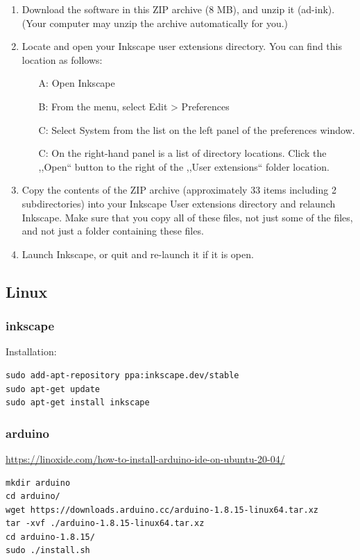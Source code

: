 \begin{enumerate}
  \item         Download the software in this ZIP archive (8 MB), and unzip it (ad-ink). (Your computer may unzip the archive automatically for you.)
  \item         Locate and open your Inkscape user extensions directory. You can find this location as follows:\begin{itemize}
  \item[A:]               Open Inkscape
  \item[B:]               From the menu, select Edit > Preferences
  \item[C:]               Select System from the list on the left panel of the preferences window.
  \item[C:]               On the right-hand panel is a list of directory locations. Click the ,,Open`` button to the right of the ,,User extensions`` folder location.
  \end{itemize}
  \item         Copy the contents of the ZIP archive (approximately 33 items including 2 subdirectories) into your Inkscape User extensions directory and relaunch Inkscape. Make sure that you copy all of these files, not just some of the files, and not just a folder containing these files.
  \item         Launch Inkscape, or quit and re-launch it if it is open.
\end{enumerate}

\subsection{Linux}
\subsubsection{inkscape}
Installation:
\begin{verbatim}
sudo add-apt-repository ppa:inkscape.dev/stable
sudo apt-get update
sudo apt-get install inkscape
\end{verbatim}

\subsubsection{arduino}
\url{https://linoxide.com/how-to-install-arduino-ide-on-ubuntu-20-04/}
\begin{verbatim}
mkdir arduino
cd arduino/
wget https://downloads.arduino.cc/arduino-1.8.15-linux64.tar.xz
tar -xvf ./arduino-1.8.15-linux64.tar.xz
cd arduino-1.8.15/
sudo ./install.sh
\end{verbatim}

